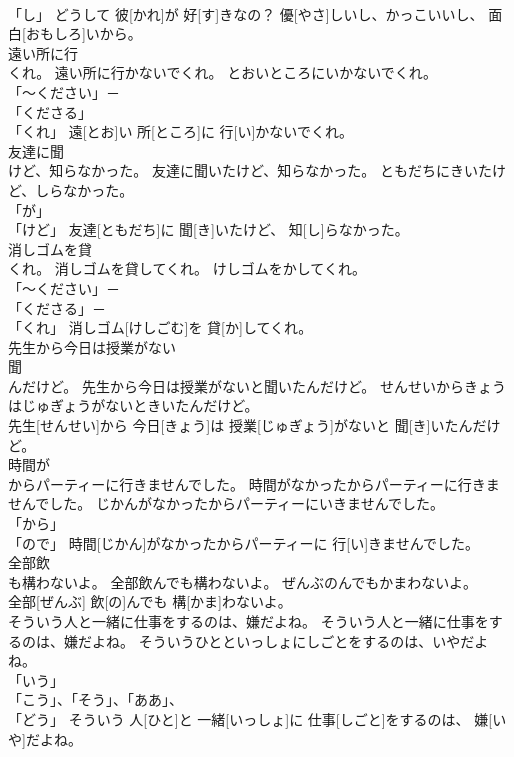 \documentclass[8pt]{extreport}
\begin{document}
\begin{CJK}{UTF8}{min}
\\	「し」	どうして 彼[かれ]が 好[す]きなの？ 優[やさ]しいし、かっこいいし、 面白[おもしろ]いから。		
\\	遠い所に行
\\	くれ。	遠い所に行かないでくれ。	とおいところにいかないでくれ。	
\\	「～ください」－ 
\\	「くださる」 
\\	「くれ」	遠[とお]い 所[ところ]に 行[い]かないでくれ。		
\\	友達に聞
\\	けど、知らなかった。	友達に聞いたけど、知らなかった。	ともだちにきいたけど、しらなかった。	
\\	「が」 
\\	「けど」	友達[ともだち]に 聞[き]いたけど、 知[し]らなかった。		
\\	消しゴムを貸
\\	くれ。	消しゴムを貸してくれ。	けしゴムをかしてくれ。	
\\	「～ください」－ 
\\	「くださる」－
\\	「くれ」	消しゴム[けしごむ]を 貸[か]してくれ。		
\\	先生から今日は授業がない
\\	聞
\\	んだけど。	先生から今日は授業がないと聞いたんだけど。	せんせいからきょうはじゅぎょうがないときいたんだけど。	
\\	先生[せんせい]から 今日[きょう]は 授業[じゅぎょう]がないと 聞[き]いたんだけど。		
\\	時間が
\\	からパーティーに行きませんでした。	時間がなかったからパーティーに行きませんでした。	じかんがなかったからパーティーにいきませんでした。	
\\	「から」 
\\	「ので」	時間[じかん]がなかったからパーティーに 行[い]きませんでした。		
\\	全部飲
\\	も構わないよ。	全部飲んでも構わないよ。	ぜんぶのんでもかまわないよ。	
\\	全部[ぜんぶ] 飲[の]んでも 構[かま]わないよ。		
\\	そういう人と一緒に仕事をするのは、嫌だよね。	そういう人と一緒に仕事をするのは、嫌だよね。	そういうひとといっしょにしごとをするのは、いやだよね。	
\\	「いう」 
\\	「こう」、「そう」、「ああ」、
\\	「どう」	そういう 人[ひと]と 一緒[いっしょ]に 仕事[しごと]をするのは、 嫌[いや]だよね。		

\end{CJK}
\end{document}
